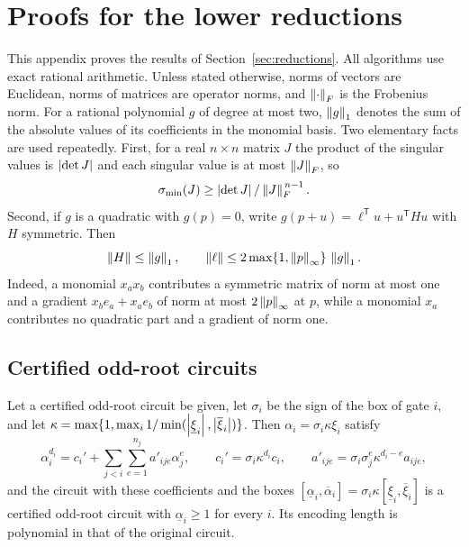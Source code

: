 \section{Proofs for the lower reductions}
\label{app:reductions}

This appendix proves the results of Section~\ref{sec:reductions}. All
algorithms use exact rational arithmetic. Unless stated otherwise, norms of
vectors are Euclidean, norms of matrices are operator norms, and
$\left\lVert\cdot\right\rVert_F$ is the Frobenius norm. For a rational polynomial $g$ of degree
at most two, $\left\lVert g\right\rVert_1$ denotes the sum of the absolute values of its
coefficients in the monomial basis. Two elementary facts are used repeatedly.
First, for a real $n\times n$ matrix $J$ the product of the singular values is
$\left\lvert\det J\right\rvert$ and each singular value is at most $\left\lVert J\right\rVert_F$, so
\begin{equation}
 \sigma_{\min}(J)\ge\left\lvert\det J\right\rvert/\left\lVert J\right\rVert_F^{\,n-1}.
 \label{eq:reductions-app-singular}
\end{equation}
Second, if $g$ is a quadratic with $g(p)=0$, write
$g(p+u)=\ell^{\mathsf T}u+u^{\mathsf T}Hu$ with $H$ symmetric. Then
\begin{equation}
 \left\lVert H\right\rVert\le\left\lVert g\right\rVert_1,\qquad
 \left\lVert\ell\right\rVert\le2\max\{1,\left\lVert p\right\rVert_\infty\}\,\left\lVert g\right\rVert_1 .
 \label{eq:reductions-app-coefficients}
\end{equation}
Indeed, a monomial $x_ax_b$ contributes a symmetric matrix of norm at most one
and a gradient $x_be_a+x_ae_b$ of norm at most $2\left\lVert p\right\rVert_\infty$ at $p$, while
a monomial $x_a$ contributes no quadratic part and a gradient of norm one.

\subsection{Certified odd-root circuits}
\label{app:reductions-root-circuits}

\begin{lemma}[Normalization]
\label{lem:reductions-normalization}
Let a certified odd-root circuit be given, let $\sigma_i$ be the sign of the
box of gate $i$, and let
$\kappa=\max\{1,\max_i1/\min(\left\lvert\underline\xi_i\right\rvert,\left\lvert\overline\xi_i\right\rvert)\}$.
Then $\alpha_i=\sigma_i\kappa\xi_i$ satisfy
\begin{equation}
 \alpha_i^{d_i}=c_i'+\sum_{j<i}\sum_{e=1}^{n_j}a'_{ije}\alpha_j^e,\qquad
 c_i'=\sigma_i\kappa^{d_i}c_i,\qquad
 a'_{ije}=\sigma_i\sigma_j^e\kappa^{d_i-e}a_{ije},
 \label{eq:reductions-normalized}
\end{equation}
and the circuit with these coefficients and the boxes
$[\underline\alpha_i,\overline\alpha_i]=\sigma_i\kappa[\underline\xi_i,\overline\xi_i]$
is a certified odd-root circuit with $\underline\alpha_i\ge1$ for every $i$.
Its encoding length is polynomial in that of the original circuit.
\end{lemma}

